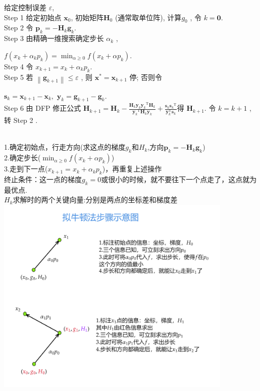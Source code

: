 \documentclass[cn]{elegantbook}
\begin{document}
\begin{algorithm}
给定控制误差 $ \varepsilon $,\\
Step 1 给定初始点 $ \boldsymbol{x}_{0} $, 初始矩阵$  \boldsymbol{H}_{0}$  (通常取单位阵), 计算$  g_{0}$ , 令  $k=\mathbf{0} $.\\
Step 2 令  $\boldsymbol{p}_{k}=-\boldsymbol{H}_{k} \boldsymbol{g}_{k} $.\\
Step 3 由精确一维搜索确定步长  $\alpha_{k}$ ,

$\displaystyle f\left(x_{k}+\alpha_{k} p_{k}\right)=\min_{\alpha \geq 0} f\left(x_{k}+\alpha p_{k}\right) $.\\
Step 4 令 $ x_{k+1}=x_{k}+\alpha_{k} p_{k} $.\\
Step 5 若  $\left\|\boldsymbol{g}_{k+1}\right\| \leqslant \varepsilon$ , 则  $\boldsymbol{x}^{*}=\boldsymbol{x}_{k+1} $ 停; 否则令

$\boldsymbol{s}_{k}=\boldsymbol{x}_{k+1}-\boldsymbol{x}_{k},$ \quad $\boldsymbol{y}_{k}=\boldsymbol{g}_{k+1}-\boldsymbol{g}_{k} $.\\

Step 6 由 DFP 修正公式 $\boldsymbol{H}_{k+1}=\boldsymbol{H}_{k}-\frac{\boldsymbol{H}_{k} \boldsymbol{y}_{k} \boldsymbol{y}_{k}{ }^{\mathrm{T}} \boldsymbol{H}_{k}}{\boldsymbol{y}_{k}{ }^{\mathrm{T}} \boldsymbol{H}_{k} \boldsymbol{y}_{k}}+\frac{\boldsymbol{s}_{k} \boldsymbol{s}_{k}{ }^{\mathrm{T}}}{\boldsymbol{y}_{k}^{\mathrm{T}} \boldsymbol{s}_{k}}$得  $\boldsymbol{H}_{k+1} $. 令 $ k=k+1$ , 转 Step 2 .
\end{algorithm}
\begin{note}
\\
  1.确定初始点，行走方向(求这点的梯度$g_k$和$H_k$,方向$\boldsymbol{p}_{k}=-\boldsymbol{H}_{k} \boldsymbol{g}_{k}$) \\
  2.确定步长($\displaystyle \min_{\alpha \geq 0} f\left(x_{k}+\alpha p_{k}\right) $) \\
  3.走到下一点($ x_{k+1}=x_{k}+\alpha_{k} p_{k} $)，再重复上述操作\\
\textcolor[rgb]{1.00,0.00,0.00}{\large 终止条件：}这一点的梯度$g_k=0$或很小的时候，就不要往下一个点走了，这点就为最优点.\\
\textcolor[rgb]{1.00,0.00,0.00}{\large $H_k$求解时的两个关键向量:}分别是两点的坐标差和梯度差\\
\includegraphics[width=0.85\textwidth]{fig1}
\end{note}
\end{document}
